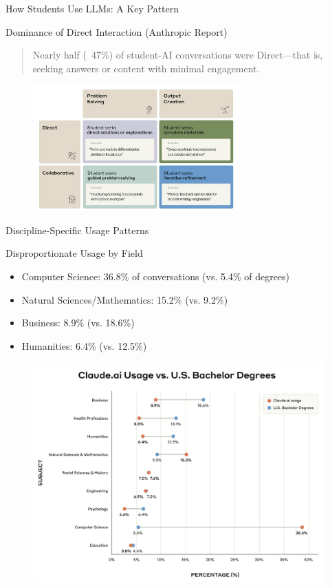 \documentclass{beamer}
\begin{document}
\begin{frame}{How Students Use LLMs: A Key Pattern}

\begin{block}{Dominance of Direct Interaction (Anthropic Report)}
\blockquote{Nearly half (~47\%) of student-AI conversations were Direct—that is, seeking answers or content with minimal engagement.}
\end{block}

 \begin{figure}
 \centering
 \includegraphics[width=8cm]{cs12-llm-student_interaction_styles.png} %
\end{figure}

\end{frame}

\begin{frame}{Discipline-Specific Usage Patterns}
\begin{block}{Disproportionate Usage by Field}
\begin{itemize}
  \item Computer Science: 36.8\% of conversations (vs. 5.4\% of degrees)
  \item Natural Sciences/Mathematics: 15.2\% (vs. 9.2\%)
  \item Business: 8.9\% (vs. 18.6\%)
  \item Humanities: 6.4\% (vs. 12.5\%)
\end{itemize}
\end{block}
\begin{figure}
    \centering
    \includegraphics[width=0.5\linewidth]{cs12-llm-discipline_usage.png}
\end{figure}
\end{frame}
\end{document}
